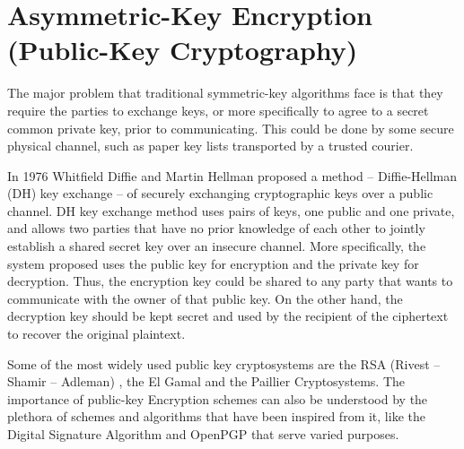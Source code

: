\section{Asymmetric-Key Encryption (Public-Key Cryptography)}\label{s:public-key-encryption}
The major problem that traditional symmetric-key algorithms face is that they require the parties to exchange keys, or more specifically to agree to a secret common private key, prior to communicating.
This could be done by some secure physical channel, such as paper key lists transported by a trusted courier.

In 1976 Whitfield Diffie and Martin Hellman proposed a method – Diffie-Hellman (DH) key exchange \cite{diffie1976new} – of securely exchanging cryptographic keys over a public channel.
DH key exchange method uses pairs of keys, one public and one private, and allows two parties that have no prior knowledge of each other to jointly establish a shared secret key over an insecure channel.
More specifically, the system proposed uses the public key for encryption and the private key for decryption.
Thus, the encryption key could be shared to any party that wants to communicate with the owner of that public key.
On the other hand, the decryption key should be kept secret and used by the recipient of the ciphertext to recover the original plaintext.



Some of the most widely used public key cryptosystems are the RSA (Rivest -- Shamir -- Adleman) \cite{rivest1978method}, the El Gamal \cite{elgamal1985public} and the Paillier \cite{paillier1999public} Cryptosystems.
The importance of public-key Encryption schemes can also be understood by the plethora of schemes and algorithms that have been inspired from it, like the Digital Signature Algorithm and OpenPGP that serve varied purposes.
